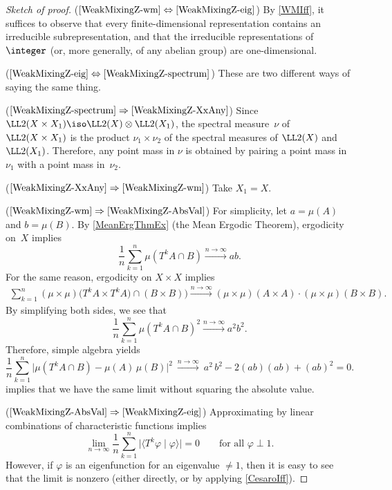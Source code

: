 \begin{proof}[Sketch of proof]
($\ref{WeakMixingZ-wm} \Leftrightarrow \ref{WeakMixingZ-eig}$) By \cref{WMIff}, it suffices to observe that every finite-dimensional representation contains an irreducible subrepresentation, and that the irreducible representations of~$\integer$ (or, more generally, of any abelian group) are one-dimensional.

($\ref{WeakMixingZ-eig} \Leftrightarrow \ref{WeakMixingZ-spectrum}$)
These are two different ways of saying the same thing.

($\ref{WeakMixingZ-spectrum} \Rightarrow \ref{WeakMixingZ-XxAny}$)
Since $\LL2(X \times X_1) \iso \LL2(X) \otimes \LL2(X_1)$, the spectral measure~$\nu$ of $\LL2(X \times X_1)$ is the product $\nu_1 \times \nu_2$ of the spectral measures of $\LL2(X)$ and $\LL2(X_1)$. Therefore, any point mass in $\nu$ is obtained by pairing a point mass in~$\nu_1$ with a point mass in~$\nu_2$.

($\ref{WeakMixingZ-XxAny} \Rightarrow \ref{WeakMixingZ-wm}$)
Take $X_1 = X$.

($\ref{WeakMixingZ-wm} \Rightarrow \ref{WeakMixingZ-AbsVal}$)
For simplicity, let $a = \mu(A)$ and $b = \mu(B)$.
By \cref{MeanErgThmEx} (the Mean Ergodic Theorem), %
ergodicity on~$X$ implies
	$$  \frac{1}{n} \sum_{k=1}^n \mu(T^k A \cap B) \stackrel{n \to \infty}{\longrightarrow} ab .$$
For the same reason, ergodicity on $X \times X$ implies
	\begin{align*}
	\sum_{k=1}^n (\mu \times \mu) \bigl (T^k A \times T^k A) \cap (B \times B) \bigr)
	\stackrel{n \to \infty}{\longrightarrow} 
	(\mu \times \mu)(A \times A) \cdot (\mu \times \mu) ( B \times B) 
	. \end{align*}
By simplifying both sides, we see that
	$$ \frac{1}{n} \sum_{k=1}^n \mu(T^k A \cap B)^2 
	\stackrel{n \to \infty}{\longrightarrow} 
	a^2 b^2 .$$
Therefore, simple algebra yields
	$$  \frac{1}{n} \sum_{k=1}^n \bigl| \mu(T^k A \cap B) - \mu(A) \, \mu(B) \bigr|^2
	\ \stackrel{n \to \infty}{\longrightarrow}  \ 
	a^2 \,b^2 - 2 (ab)(ab) + (ab)^2
	= 0
	. $$
 implies that we have the same limit without squaring the absolute value.

($\ref{WeakMixingZ-AbsVal} \Rightarrow \ref{WeakMixingZ-eig}$)
Approximating by linear combinations of characteristic functions implies
	$$ \lim_{n \to \infty} \frac{1}{n} \sum_{k=1}^n \bigl| \langle T^k \varphi \mid \varphi \rangle  \bigr|
	= 0 
	\qquad \text{for all $\varphi \perp 1$} 
	. $$
However, if $\varphi$ is an eigenfunction for an eigenvalue $\neq 1$, then it is easy to see that the limit is nonzero (either directly, or by applying \cref{CesaroIff}).


\end{proof}
